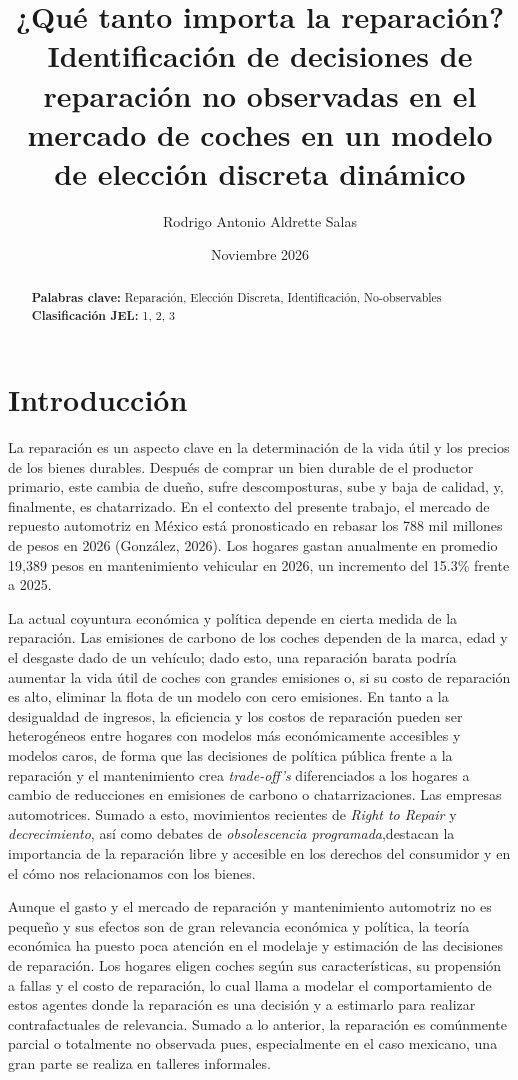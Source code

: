 \documentclass{article}
\title{¿Qué tanto importa la reparación? Identificación de decisiones de reparación no observadas en el mercado de coches en un modelo de elección discreta dinámico}
\author{Rodrigo Antonio Aldrette Salas}
\date{Noviembre 2026}
\begin{document}
\maketitle

\begin{abstract}


\medskip
\noindent\textbf{Palabras clave:} Reparación, Elección Discreta, Identificación, No-observables\\
\noindent\textbf{Clasificación JEL:} 1, 2, 3
\end{abstract}

\section{Introducción}

La reparación es un aspecto clave en la determinación de la vida útil y los precios de los bienes durables. Después de comprar un bien durable de el productor primario, este cambia de dueño, sufre descomposturas, sube y baja de calidad, y, finalmente, es chatarrizado. En el contexto del presente trabajo, el mercado de repuesto automotriz en México está pronosticado en rebasar los 788 mil millones de pesos en 2026 (González, 2026). Los hogares gastan anualmente en promedio 19,389 pesos en mantenimiento vehicular en 2026, un incremento del 15.3\% frente a 2025. 

La actual coyuntura económica y política depende en cierta medida de la reparación. Las emisiones de carbono de los coches dependen de la marca, edad y el desgaste dado de un vehículo; dado esto, una reparación barata podría aumentar la vida útil de coches con grandes emisiones o, si su costo de reparación es alto, eliminar la flota de un modelo con cero emisiones. En tanto a la desigualdad de ingresos, la eficiencia y los costos de reparación pueden ser heterogéneos entre hogares con modelos más económicamente accesibles y modelos caros, de forma que las decisiones de política pública frente a la reparación y el mantenimiento crea \textit{trade-off's} diferenciados a los hogares a cambio de reducciones en emisiones de carbono o chatarrizaciones. Las empresas automotrices. Sumado a esto, movimientos recientes de \textit{Right to Repair} y \textit{decrecimiento}, así como debates de \textit{obsolescencia programada},destacan la importancia de la reparación libre y accesible en los derechos del consumidor y en el cómo nos relacionamos con los bienes.

Aunque el gasto y el mercado de reparación y mantenimiento automotriz no es pequeño y sus efectos son de gran relevancia económica y política, la teoría económica ha puesto poca atención en el modelaje y estimación de las decisiones de reparación. Los hogares eligen coches según sus características, su propensión a fallas y el costo de reparación, lo cual llama a modelar el comportamiento de estos agentes donde la reparación es una decisión y a estimarlo para realizar contrafactuales de relevancia. Sumado a lo anterior, la reparación es comúnmente parcial o totalmente no observada pues, especialmente en el caso mexicano, una gran parte se realiza en talleres informales. 
\end{document}
